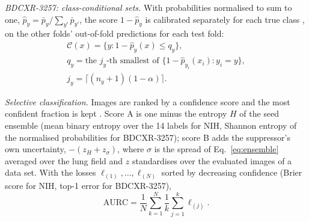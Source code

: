 \emph{BDCXR-3257: class-conditional sets.} With probabilities normalised to sum to one, $\hat p_y=\bar p_y/\sum_{y'}\bar p_{y'}$, the score
$1-\hat p_y$ is calibrated separately for each true class \cite{vovk2005algorithmic}, on the other folds' out-of-fold predictions for each
test fold:
\begin{equation}
\begin{gathered}
\mathcal{C}(x)=\{y:1-\hat p_y(x)\le q_y\},\\
q_y=\text{the }j_y\text{-th smallest of }\{1-\hat p_{y_i}(x_i):y_i=y\},\\
j_y=\lceil (n_y+1)(1-\alpha)\rceil.
\end{gathered}
\label{eq:mondriansets}
\end{equation}

\emph{Selective classification.} Images are ranked by a confidence score and the most confident fraction is kept
\cite{geifman2017selective,geifman2019bias}. Score A is one minus the entropy $H$ of the seed ensemble (mean binary entropy over the 14
labels for NIH, Shannon entropy of the normalised probabilities for BDCXR-3257); score B adds the suppressor's own uncertainty,
$-(z_H+z_\sigma)$, where $\sigma$ is the spread of Eq.~\eqref{eq:ensemble} averaged over the lung field and $z$ standardises over the
evaluated images of a data set. With the losses $\ell_{(1)},\dots,\ell_{(N)}$ sorted by decreasing confidence (Brier score for NIH, top-1
error for BDCXR-3257),
\begin{equation}
\mathrm{AURC}=\frac1N\sum_{k=1}^{N}\frac1k\sum_{j=1}^{k}\ell_{(j)}.
\label{eq:aurc}
\end{equation}

